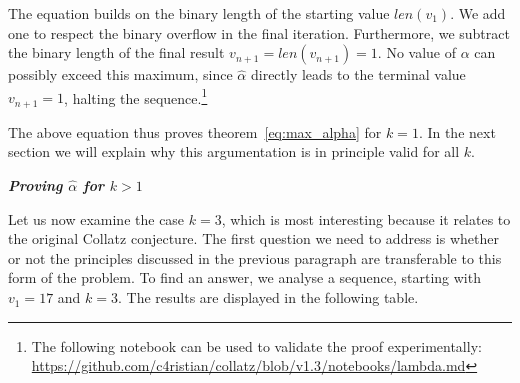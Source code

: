 \documentclass{SciPress_2015}
\renewcommand{\subsection}[1]{\textit{\textbf{#1}}}
\begin{document}
The equation builds on the binary length of the starting value $len(v_1)$. We add one to respect the binary overflow in the final iteration. Furthermore, we subtract the binary length of the final result $v_{n+1}=len(v_{n+1})=1$. No value of $\alpha$ can possibly exceed this maximum, since $\hat\alpha$ directly leads to the terminal value $v_{n+1}=1$, halting the sequence.\footnote{The following notebook can be used to validate the proof experimentally:\\ \hspace*{7mm}\url{https://github.com/c4ristian/collatz/blob/v1.3/notebooks/lambda.md}}

\par\medskip
The above equation thus proves theorem~\ref{eq:max_alpha} for $k=1$. In the next section we will explain why this argumentation is in principle valid for all $k$.

\vspace{1em}\noindent
\subsection{Proving \boldmath$\hat\alpha$ for \boldmath$k>1$}
\par\noindent
Let us now examine the case $k=3$, which is most interesting because it relates to the original Collatz conjecture. The first question we need to address is whether or not the principles discussed in the previous paragraph are transferable to this form of the problem. To find an answer, we analyse a sequence, starting with $v_1=17$ and $k=3$. The results are displayed in the following table.
\end{document}
